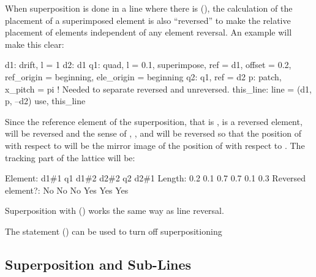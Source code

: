 When superposition is done in a line where there is  (),
the calculation of the placement of a superimposed element is also ``reversed'' to make the relative
placement of elements independent of any element reversal.  An example will make this clear:
\begin{example}
  d1: drift, l = 1
  d2: d1
  q1: quad, l = 0.1, superimpose, ref = d1, offset = 0.2, 
             ref_origin = beginning, ele_origin = beginning
  q2: q1, ref = d2
  p: patch, x_pitch = pi  ! Needed to separate reversed and unreversed.
  this_line: line = (d1, p, --d2)
  use, this_line
\end{example}
Since the reference element of the  superposition, that is , is a reversed element,
 will be reversed and the sense of , , and  will be
reversed so that the position of  with respect to  will be the mirror image of the
position of  with respect to . The tracking part of the lattice will be:
\begin{example}
  Element:           d1{\#}1    q1  d1{\#}2   d2{\#}2    q2   d2{\#}1
  Length:             0.2   0.1   0.7    0.7   0.1    0.3
  Reversed element?:   No    No    No    Yes   Yes    Yes
\end{example}

Superposition with  () works the same way as line reversal.

The  statement () can be used to turn off superpositioning

\subsection{Superposition and Sub-Lines}
\label{s:super.sub.line}

